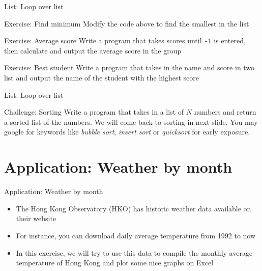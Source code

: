 \documentclass[10pt,xcolor={table,dvipsnames},t]{beamer}
\begin{document}
\begin{frame}{List: Loop over list}
  \begin{exampleblock}{Exercise: Find minimum}
    Modify the code above to find the smallest in the list
  \end{exampleblock}
  \begin{exampleblock}{Exercise: Average score}
    Write a program that takes scores until \texttt{-1} is entered, then calculate and output the average score in the group
  \end{exampleblock}
  \begin{exampleblock}{Exercise: Best student}
    Write a program that takes in the name and score in two list and output the name of the student with the highest score
  \end{exampleblock}
\end{frame}


\begin{frame}{List: Loop over list}
  \begin{exampleblock}{Challenge: Sorting}
    Write a program that takes in a list of $N$ numbers and return a sorted list of the numbers. We will come back to sorting in next slide. You may google for keywords like \textit{bubble sort}, \textit{insert sort} or \textit{quicksort} for early exposure.
  \end{exampleblock}
\end{frame}

\section{Application: Weather by month}
\begin{frame}{Application: Weather by month}
  \begin{itemize}
    \item The Hong Kong Observatory (HKO) has historic weather data available on their website
    \item For instance, you can download daily average temperature from 1992 to now
    \item In this exercise, we will try to use this data to compile the monthly average temperature of Hong Kong and plot some nice graphs on Excel
  \end{itemize}
\end{frame}
\end{document}
